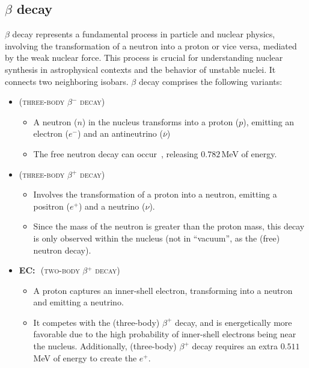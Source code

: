 \subsection{$\beta$ decay}\label{subsec:intro:betad}
$\beta$ decay represents a fundamental process in particle and nuclear physics, involving the transformation of a neutron into a proton or vice versa, mediated by the weak nuclear force. This process is crucial for understanding nuclear synthesis in astrophysical contexts and the behavior of unstable nuclei. It connects two neighboring isobars. $\beta$ decay comprises the following variants:

\begin{itemize}
    \item {} \hfill {(\textsc{three-body $\beta^-$ decay})}
    \begin{itemize}
        \item A neutron ($n$) in the nucleus transforms into a proton ($p$), emitting an electron ($e^{-}$) and an antineutrino ($\overline{\nu}$)
        \item The free neutron decay can occur~\cite{freeneutrondecay}, releasing $0.782$\,MeV of energy.
    \end{itemize}
    \item {} \hfill {(\textsc{three-body $\beta^+$ decay})}
    \begin{itemize}
        \item Involves the transformation of a proton into a neutron, emitting a positron ($e^{+}$) and a neutrino ($\nu$).
        \item Since the mass of the neutron is greater than the proton mass, this decay is only observed within the nucleus (not in ``vacuum'', as the (free) neutron decay).
    \end{itemize}
    \item \textbf{EC:}\,\, \hfill {(\textsc{two-body $\beta^+$ decay})}
    \begin{itemize}
        \item A proton captures an inner-shell electron, transforming into a neutron and emitting a neutrino.
        \item It competes with the (three-body) $\beta^{+}$ decay, and is energetically more favorable due to the high probability of inner-shell electrons being near the nucleus. Additionally, (three-body) $\beta^+$ decay requires an extra $0.511$\,MeV of energy to create the $e^{+}$.
    \end{itemize}
\end{itemize}

